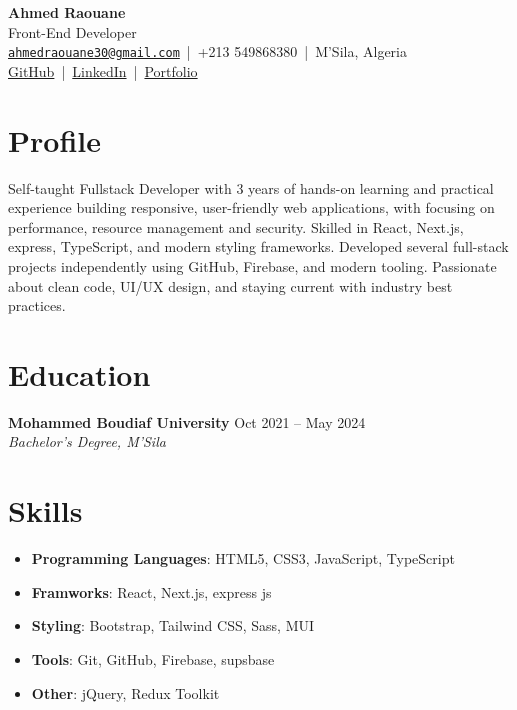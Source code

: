 \documentclass[a4paper,12pt]{article}
\begin{document}
\pagestyle{empty}

\begin{center}
    {\LARGE \textbf{Ahmed Raouane}}\\
    {\large Front-End Developer}\\[0.5em]
    \href{mailto:ahmedraouane30@gmail.com}{\texttt{ahmedraouane30@gmail.com}} \,|\, +213 549868380 \,|\, M’Sila, Algeria\\
    \href{https://github.com/ahmedRAOUANE}{GitHub} \,|\, 
    \href{https://linkedin.com/in/ahmed-raouane}{LinkedIn} \,|\, 
    \href{https://portfolio-ahmedraouanes-projects.vercel.app/}{Portfolio}
\end{center}

\section*{Profile}
\noindent Self-taught Fullstack Developer with 3 years of hands-on learning and practical experience building responsive, user-friendly web applications, with focusing on performance, resource management and security. Skilled in React, Next.js, express, TypeScript, and modern styling frameworks. Developed several full-stack projects independently using GitHub, Firebase, and modern tooling. Passionate about clean code, UI/UX design, and staying current with industry best practices.

\section*{Education}
\textbf{Mohammed Boudiaf University} \hfill Oct 2021 -- May 2024\\
\textit{Bachelor’s Degree, M’Sila}

\section*{Skills}
\begin{itemize}[noitemsep]
    \item \textbf{Programming Languages}: HTML5, CSS3, JavaScript, TypeScript
    \item  \textbf{Framworks}: React, Next.js, express js
    \item \textbf{Styling}: Bootstrap, Tailwind CSS, Sass, MUI
    \item \textbf{Tools}: Git, GitHub, Firebase, supsbase
    \item \textbf{Other}: jQuery, Redux Toolkit
\end{itemize}
\end{document}
